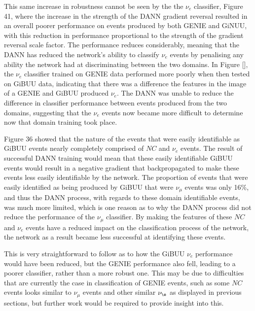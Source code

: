 \noindent This same increase in robustness cannot be seen by the the $\nu_e$ classifier, Figure 41, where the increase in the strength of the DANN gradient reversal resulted in an overall poorer performance on events produced by both GENIE and GiNUU, with this reduction in performance proportional to the strength of the gradient reversal scale factor. The performance reduces considerably, meaning that the DANN has reduced the network's ability to classify $\nu_e$ events by penalising any ability the network had at discriminating between the two domains. In Figure [], the $\nu_e$ classifier trained on GENIE data performed more poorly when then tested on GiBUU data, indicating that there was a difference the features in the image of a GENIE and GiBUU produced $\nu_e$. The DANN was unable to reduce the difference in classifier performance between events produced from the two domains, suggesting that the $\nu_e$ events now became more difficult to determine now that domain training took place.\medskip


\noindent Figure 36 showed that the nature of the events that were easily identifiable as GiBUU events nearly completely comprised of $NC$ and $\nu_e$ events. The result of successful DANN training would mean that these easily identifiable GiBUU events would result in a negative gradient that backpropagated to make these events less easily identifiable by the network. The proportion of events that were easily identified as being produced by GiBUU that were $\nu_\mu$ events was only 16\%, and thus the DANN process, with regards to these domain identifiable events, was much more limited, which is one reason as to why the DANN process did not reduce the performance of the $\nu_\mu$ classifier. By making the features of these $NC$ and $\nu_e$ events have a reduced impact on the classification process of the network, the network as a result became less successful at identifying these events. \medskip

\noindent This is very straightforward to follow as to how the GiBUU $\nu_e$ performance would have been reduced, but the GENIE performance also fell, leading to a poorer classifier, rather than a more robust one. This may be due to difficulties that are currently the case in classification of GENIE events, such as some $NC$ events looks similar to $\nu_\mu$ events and other similar $\nu_\e$ as displayed in previous sections, but further work would be required to provide insight into this.\medskip



